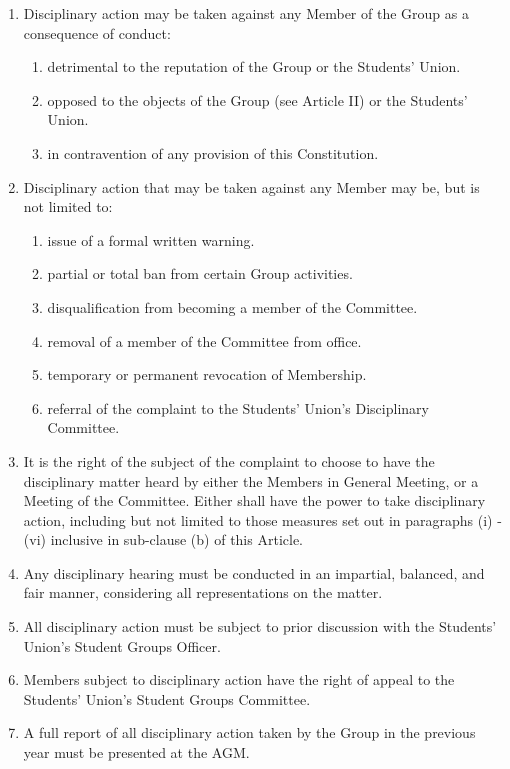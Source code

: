 \documentclass[12pt]{constitution}
\begin{document}
\begin{enumerate}
    \item Disciplinary action may be taken against any Member of the Group as a consequence of conduct:
    \begin{enumerate}
        \item detrimental to the reputation of the Group or the Students' Union.
        \item opposed to the objects of the Group (see Article II) or the Students' Union.
        \item in contravention of any provision of this Constitution.
    \end{enumerate}
    \item Disciplinary action that may be taken against any Member may be, but is not limited to:
    \begin{enumerate}
        \item issue of a formal written warning.
        \item partial or total ban from certain Group activities.
        \item disqualification from becoming a member of the Committee.
        \item removal of a member of the Committee from office.
        \item temporary or permanent revocation of Membership.
        \item referral of the complaint to the Students' Union's Disciplinary Committee.
    \end{enumerate}

\item It is the right of the subject of the complaint to choose to have the disciplinary matter heard by either the Members in General Meeting, or a Meeting of the Committee.  Either shall have the power to take disciplinary action, including but not limited to those measures set out in paragraphs (i) - (vi) inclusive in sub-clause (b) of this Article.

    \item Any disciplinary hearing must be conducted in an impartial, balanced, and fair manner, considering all representations on the matter.

    \item All disciplinary action must be subject to prior discussion with the Students' Union's Student Groups Officer.

    \item Members subject to disciplinary action have the right of appeal to the Students' Union's Student Groups Committee.
    
    \item A full report of all disciplinary action taken by the Group in the previous year must be presented at the AGM.
\end{enumerate}
\end{document}
